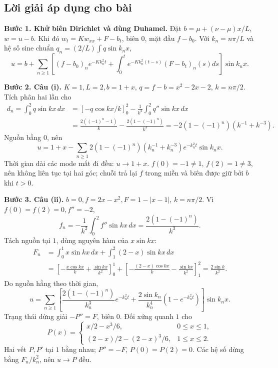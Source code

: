 \documentclass[10pt,a4paper]{article}
\begin{document}
\subsection*{Lời giải áp dụng cho bài}
\textbf{Bước 1. Khử biên Dirichlet và dùng Duhamel.}
Đặt $b=\mu+(\nu-\mu)x/L$, $w=u-b$. Khi đó $w_t=Kw_{xx}+F-b_t$, biên $0$, mặt đầu $f-b_0$. Với $k_n=n\pi/L$ và hệ số sine chuẩn $q_n=(2/L)\int q\sin k_nx$,
\[u=b+\sum_{n\ge1}\left[(f-b_0)_ne^{-Kk_n^2t}
+\int_0^te^{-Kk_n^2(t-s)}(F-b_t)_n(s)ds\right]\sin k_nx.\]

\textbf{Bước 2. Câu (i).} $K=1,L=2,b=1+x$, $q=f-b=x^2-2x-2$, $k=n\pi/2$. Tích phân hai lần cho
\begin{align*}
d_n=\int_0^2q\sin kx\,dx
&=\left[-q\cos kx/k\right]_0^2-\frac1{k^2}\int_0^2q''\sin kx\,dx\\
&=\frac{2((-1)^n-1)}k-\frac{2(1-(-1)^n)}{k^3}
=-2(1-(-1)^n)(k^{-1}+k^{-3}).
\end{align*}
Nguồn bằng $0$, nên
\[u=1+x-\sum_{n\ge1}2(1-(-1)^n)(k_n^{-1}+k_n^{-3})e^{-k_n^2t}\sin k_nx.\]
Thời gian dài các mode mất đi đều: $u\to1+x$. $f(0)=-1\ne1$, $f(2)=1\ne3$, nên không liên tục tại hai góc; chuỗi trả lại $f$ trong miền và biên được giữ bởi $b$ khi $t>0$.

\textbf{Bước 3. Câu (ii).} $b=0,f=2x-x^2,F=1-|x-1|$, $k=n\pi/2$. Vì $f(0)=f(2)=0,f''=-2$,
\[f_n=-\frac1{k^2}\int_0^2f''\sin kx\,dx=\frac{2(1-(-1)^n)}{k^3}.\]
Tách nguồn tại $1$, dùng nguyên hàm của $x\sin kx$:
\begin{align*}
F_n&=\int_0^1x\sin kx\,dx+\int_1^2(2-x)\sin kx\,dx\\
&=\left[-\frac{x\cos kx}k+\frac{\sin kx}{k^2}\right]_0^1
+\left[-\frac{(2-x)\cos kx}k-\frac{\sin kx}{k^2}\right]_1^2
=\frac{2\sin k}{k^2}.
\end{align*}
Do nguồn hằng theo thời gian,
\[u=\sum_{n\ge1}\left[\frac{2(1-(-1)^n)}{k_n^3}e^{-k_n^2t}
+\frac{2\sin k_n}{k_n^4}(1-e^{-k_n^2t})\right]\sin k_nx.\]
Trạng thái dừng giải $-P''=F$, biên $0$. Đối xứng quanh $1$ cho
\[P(x)=\begin{cases}x/2-x^3/6,&0\le x\le1,\\(2-x)/2-(2-x)^3/6,&1\le x\le2.\end{cases}\]
Hai vết $P,P'$ tại $1$ bằng nhau; $P''=-F$, $P(0)=P(2)=0$. Các hệ số dừng bằng $F_n/k_n^2$, nên $u\to P$ đều.
\end{document}
